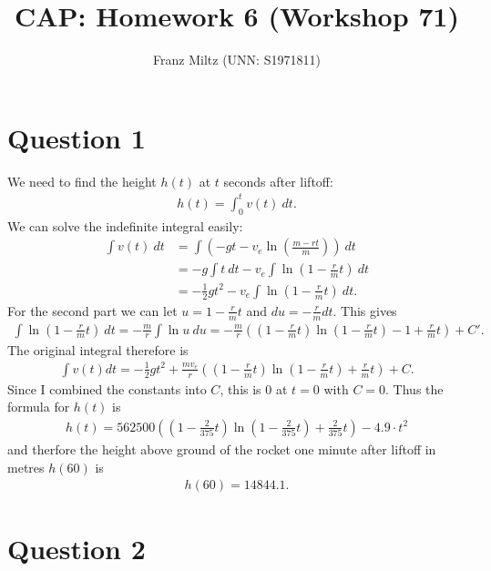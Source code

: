 \documentclass{article}
\title{CAP: Homework 6 (Workshop 71)}
\author{Franz Miltz (UNN: S1971811)}
\begin{document}
\maketitle
\section*{Question 1}
We need to find the height $h(t)$ at $t$ seconds after liftoff:
\begin{align*}
  h(t) = \int_0^t v(t)\: dt.
\end{align*}
We can solve the indefinite integral easily:
\begin{align*}
  \int v(t)\:dt &= \int \left(-gt -v_e \ln \left(\frac{m-rt}{m}\right)\right)\:dt \\
  &= -g \int t\: dt -v_e \int \ln\left(1-\frac{r}{m}t\right)\: dt \\
  &=-\frac{1}{2}gt^2-v_e \int \ln\left(1-\frac{r}{m}t\right)\:dt.
\end{align*}
For the second part we can let $u=1-\frac{r}{m}t$  and  $du = -\frac{r}{m}dt$. This gives
\begin{align*}
  \int\ln\left(1-\frac{r}{m}t\right)\: dt = -\frac{m}{r}\int \ln u\: du = -\frac{m}{r}\left(\left(1-\frac{r}{m}t\right)\ln\left(1-\frac{r}{m}t\right)-1+\frac{r}{m}t\right)+C'.
\end{align*}
The original integral therefore is
\begin{align*}
  \int v(t)dt =-\frac{1}{2}gt^2+\frac{mv_e}{r}\left(\left(1-\frac{r}{m}t\right)\ln\left(1-\frac{r}{m}t\right)+\frac{r}{m}t\right)+C.
\end{align*}
Since I combined the constants into $C$, this is $0$ at $t=0$ with $C=0$. Thus the formula for $h(t)$ is
\begin{align*}
  h(t)=562500\left(\left(1-\frac{2}{375}t\right)\ln\left(1-\frac{2}{375}t\right)+\frac{2}{375}t\right) -4.9\cdot t^2
\end{align*}
and therfore the height above ground of the rocket one minute after liftoff in metres $h(60)$ is
\begin{align*}
  h(60)=14844.1.
\end{align*}
\section*{Question 2}
\end{document}
